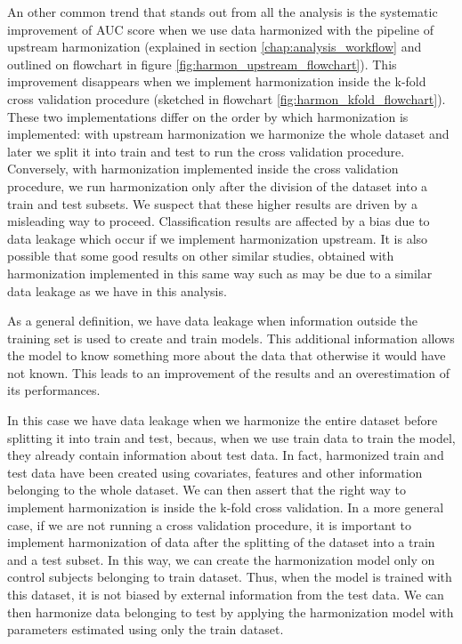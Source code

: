 \documentclass[11pt]{report}
\begin{document}
\noindent An other common trend that stands out from all the analysis is the systematic improvement of AUC score when we use data harmonized with the pipeline of upstream harmonization (explained in section \ref{chap:analysis_workflow} and outlined on flowchart in figure \ref{fig:harmon_upstream_flowchart}).
This improvement disappears when we implement harmonization inside the k-fold cross validation procedure (sketched in flowchart \ref{fig:harmon_kfold_flowchart}).
These two implementations differ on the order by which harmonization is implemented: with upstream harmonization we harmonize the whole dataset and later we split it into train and test to run the cross validation procedure.
Conversely, with harmonization implemented inside the cross validation procedure, we run harmonization only after the division of the dataset into a train and test subsets.
We suspect that these higher results are driven by a misleading way to proceed.
Classification results are affected by a bias due to data leakage which occur if we implement harmonization upstream.
It is also possible that some good results on other similar studies, obtained with harmonization implemented in this same way such as \cite{ingalhalikar-2021} may be due to a similar data leakage as we have in this analysis.

As a general definition, we have data leakage when information outside the training set is used to create and train models. This additional information allows the model to know something more about the data that otherwise it would have not known.
This leads to an improvement of the results and an overestimation of its performances.

In this case we have data leakage when we harmonize the entire dataset before splitting it into train and test, becaus, when we use train data to train the model, they already contain information about test data.
In fact, harmonized train and test data have been created using covariates, features and other information belonging to the whole dataset.
We can then assert that the right way to implement harmonization is inside the k-fold cross validation. 
In a more general case, if we are not running a cross validation procedure, it is important to implement harmonization of data after the splitting of the dataset into a train and a test subset.
In this way, we can create the harmonization model only on control subjects belonging to train dataset.
Thus, when the model is trained with this dataset, it is not biased by external information from the test data.
We can then harmonize data belonging to test by applying the harmonization model with parameters estimated using only the train dataset.
\end{document}
